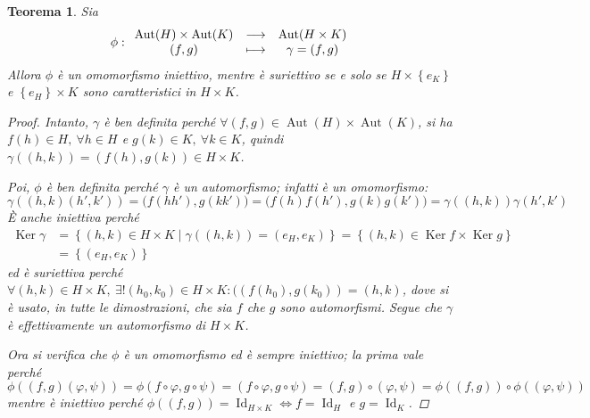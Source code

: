 \documentclass[12pt]{scrartcl}
\theoremstyle{style}
\newtheorem{teorema}{Teorema}[section]
\numberwithin{equation}{subsection}
\begin{document}
\begin{teorema}
	Sia
	\[
	\phi : 
	\begin{array}
		{c c c}
		\operatorname{Aut} (H) \times \operatorname{Aut} (K) & \longrightarrow & \operatorname{Aut} (H \times K)\\
		(f,g) & \longmapsto & \gamma = (f,g)
	\end{array}
	\] 
	Allora $\phi $ \`e un omomorfismo iniettivo, mentre \`e suriettivo se e solo se $H \times \left\{ e_K \right\} $ e $\left\{ e_H \right\} \times K$ sono caratteristici in $H\times K$.
	\begin{proof}
		Intanto, $\gamma$ \`e ben definita perch\'e $\forall (f , g) \in \operatorname{Aut} (H ) \times \operatorname{Aut}(K) $, si ha $f(h) \in H, \ \forall h \in H$ e $g(k) \in K, \ \forall k \in K$, quindi $\gamma((h,k)) = (f(h),g(k)) \in H \times  K$.
		
		Poi, $\phi $ \`e ben definita perch\'e $\gamma$ \`e un automorfismo; infatti \`e un omomorfismo:
		\[
		\gamma((h,k)(h',k'))=\big(f(hh'),g(kk')\big) = \big(f(h)f(h') , g(k) g(k')\big) =\gamma((h,k)) \gamma(h',k')
		\] 
		\`E anche iniettiva perch\'e 
\[
	\begin{split}
		\operatorname{Ker} \gamma &= \left\{ (h,k) \in H \times K  \mid \gamma((h,k)) = (e_H,e_K) \right\} = \left\{ (h,k) \in \operatorname{Ker} f \times \operatorname{Ker} g \right\} \\
					  &= \left\{ (e_H,e_K) \right\} 
	\end{split}
\] 
		ed \`e suriettiva perch\'e $\forall (h,k) \in H \times  K, \ \exists ! (h_0,k_0) \in H\times K : ((f(h_0),g(k_0)) = (h,k)$, dove si \`e usato, in tutte le dimostrazioni, che sia $f$ che $g$ sono automorfismi.
		Segue che $\gamma$ \`e effettivamente un automorfismo di $H \times K$.

Ora si verifica che $\phi $ \`e un omomorfismo ed \`e sempre iniettivo; la prima vale perch\'e 
\[
\phi ((f,g)(\varphi ,\psi )) = \phi (f\circ\varphi ,g\circ\psi ) = (f\circ\varphi , g \circ\psi )= (f,g)\circ(\varphi ,\psi )=\phi ((f,g))\circ \phi ((\varphi ,\psi ))
\] 
mentre \`e iniettivo perch\'e $\phi ((f,g))= \operatorname{Id} _{H\times K}  \iff f = \operatorname{Id} _H$ e $g = \operatorname{Id} _K$.


\end{proof}
\end{teorema}
\end{document}
